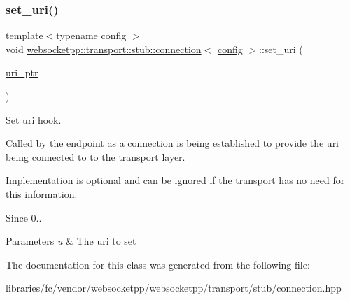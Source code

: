 \subsubsection{\texorpdfstring{set\+\_\+uri()}{set\_uri()}}
{\footnotesize\ttfamily template$<$typename config $>$ \\
void \mbox{\hyperlink{classwebsocketpp_1_1transport_1_1stub_1_1connection}{websocketpp\+::transport\+::stub\+::connection}}$<$ \mbox{\hyperlink{classconfig}{config}} $>$\+::set\+\_\+uri (\begin{DoxyParamCaption}\item[{\mbox{\hyperlink{namespacewebsocketpp_aae370ea5ac83a8ece7712cb39fc23f5b}{uri\+\_\+ptr}}}]{ }\end{DoxyParamCaption})\hspace{0.3cm}{\ttfamily [inline]}}



Set uri hook. 

Called by the endpoint as a connection is being established to provide the uri being connected to to the transport layer.

Implementation is optional and can be ignored if the transport has no need for this information.

\begin{DoxySince}{Since}
0..
\end{DoxySince}

\begin{DoxyParams}{Parameters}
{\em u} & The uri to set \\
\hline
\end{DoxyParams}


The documentation for this class was generated from the following file\+:\begin{DoxyCompactItemize}
\item 
libraries/fc/vendor/websocketpp/websocketpp/transport/stub/connection.\+hpp\end{DoxyCompactItemize}
